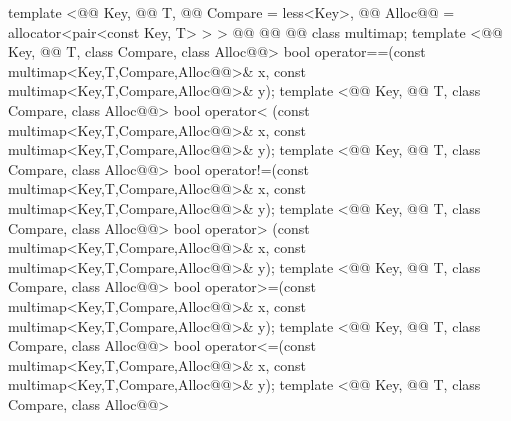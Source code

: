 \documentclass[american,twoside]{book}
\begin{document}
\begin{codeblock}
{  template <@@ Key, @@ T, 
            @@ Compare = less<Key>,
            @@ Alloc@@ = allocator<pair<const Key, T> > >
    @@
             @@
             @@
    class multimap;
  template <@@ Key, @@ T, class Compare, class Alloc@@>
    bool operator==(const multimap<Key,T,Compare,Alloc@@>& x,
                    const multimap<Key,T,Compare,Alloc@@>& y);
  template <@@ Key, @@ T, class Compare, class Alloc@@>
    bool operator< (const multimap<Key,T,Compare,Alloc@@>& x,
                    const multimap<Key,T,Compare,Alloc@@>& y);
  template <@@ Key, @@ T, class Compare, class Alloc@@>
    bool operator!=(const multimap<Key,T,Compare,Alloc@@>& x,
                    const multimap<Key,T,Compare,Alloc@@>& y);
  template <@@ Key, @@ T, class Compare, class Alloc@@>
    bool operator> (const multimap<Key,T,Compare,Alloc@@>& x,
                    const multimap<Key,T,Compare,Alloc@@>& y);
  template <@@ Key, @@ T, class Compare, class Alloc@@>
    bool operator>=(const multimap<Key,T,Compare,Alloc@@>& x,
                    const multimap<Key,T,Compare,Alloc@@>& y);
  template <@@ Key, @@ T, class Compare, class Alloc@@>
    bool operator<=(const multimap<Key,T,Compare,Alloc@@>& x,
                    const multimap<Key,T,Compare,Alloc@@>& y);
  template <@@ Key, @@ T, class Compare, class Alloc@@>
}
\end{codeblock}
\end{document}
